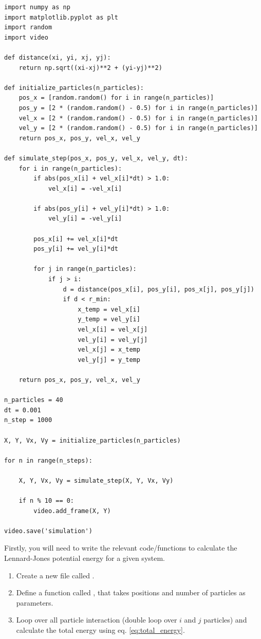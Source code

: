 \documentclass{article}
\begin{document}
\begin{lstlisting}
import numpy as np
import matplotlib.pyplot as plt
import random
import video

def distance(xi, yi, xj, yj):
    return np.sqrt((xi-xj)**2 + (yi-yj)**2)

def initialize_particles(n_particles):
    pos_x = [random.random() for i in range(n_particles)]
    pos_y = [2 * (random.random() - 0.5) for i in range(n_particles)]
    vel_x = [2 * (random.random() - 0.5) for i in range(n_particles)]
    vel_y = [2 * (random.random() - 0.5) for i in range(n_particles)]
    return pos_x, pos_y, vel_x, vel_y

def simulate_step(pos_x, pos_y, vel_x, vel_y, dt):
    for i in range(n_particles):
        if abs(pos_x[i] + vel_x[i]*dt) > 1.0:
            vel_x[i] = -vel_x[i]

        if abs(pos_y[i] + vel_y[i]*dt) > 1.0:
            vel_y[i] = -vel_y[i]

        pos_x[i] += vel_x[i]*dt
        pos_y[i] += vel_y[i]*dt

        for j in range(n_particles):
            if j > i:
                d = distance(pos_x[i], pos_y[i], pos_x[j], pos_y[j])
                if d < r_min:
                    x_temp = vel_x[i]
                    y_temp = vel_y[i]
                    vel_x[i] = vel_x[j]
                    vel_y[i] = vel_y[j]
                    vel_x[j] = x_temp
                    vel_y[j] = y_temp

    return pos_x, pos_y, vel_x, vel_y

n_particles = 40
dt = 0.001
n_step = 1000

X, Y, Vx, Vy = initialize_particles(n_particles)

for n in range(n_steps):

    X, Y, Vx, Vy = simulate_step(X, Y, Vx, Vy)

    if n % 10 == 0:
        video.add_frame(X, Y)

video.save('simulation')

\end{lstlisting}



\newpage
\clearpage

Firstly, you will need to write the relevant code/functions to calculate the Lennard-Jones potential energy for a given system.

\begin{enumerate}

    \item Create a new file called .

    \item Define a function called , that takes positions and number of particles as parameters.

    \item Loop over all particle interaction (double loop over $i$ and $j$ particles) and calculate the total energy using eq. \ref{eq:total_energy}.

\end{enumerate}
\end{document}

